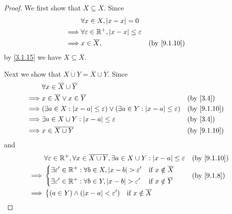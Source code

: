 \begin{proof}
  We first show that \(X \subseteq \overline{X}\).
  Since
  \begin{align*}
             & \forall x \in X, \abs{x - x} = 0                                            \\
    \implies & \forall \varepsilon \in \R^+, \abs{x - x} \leq \varepsilon                  \\
    \implies & x \in \overline{X},                                        &  & \by{9.1.10}
  \end{align*}
  by \cref{3.1.15} we have \(X \subseteq \overline{X}\).

  Next we show that \(\overline{X \cup Y} = \overline{X} \cup \overline{Y}\).
  Since
  \begin{align*}
             & \forall x \in \overline{X} \cup \overline{Y}                                                                            \\
    \implies & x \in \overline{X} \lor x \in \overline{Y}                                                             &  & \by{3.4}    \\
    \implies & (\exists a \in X : \abs{x - a} \leq \varepsilon) \lor (\exists a \in Y : \abs{x - a} \leq \varepsilon) &  & \by{9.1.10} \\
    \implies & \exists a \in X \cup Y : \abs{x - a} \leq \varepsilon                                                  &  & \by{3.4}    \\
    \implies & x \in \overline{X \cup Y}                                                                              &  & \by{9.1.10}
  \end{align*}
  and
  \begin{align*}
             & \forall \varepsilon \in \R^+, \forall x \in \overline{X \cup Y}, \exists a \in X \cup Y : \abs{x - a} \leq \varepsilon &  & \by{9.1.10} \\
    \implies & \begin{dcases}
                 \exists \varepsilon' \in \R^+ : \forall b \in X, \abs{x - b} > \varepsilon' & \text{if } x \notin \overline{X} \\
                 \exists \varepsilon' \in \R^+ : \forall b \in Y, \abs{x - b} > \varepsilon' & \text{if } x \notin \overline{Y}
               \end{dcases}      &  & \by{9.1.8}                          \\
    \implies & \begin{dcases}
                 (a \in Y) \land (\abs{x - a} < \varepsilon') & \text{if } x \notin \overline{X} \\

\end{dcases}
\end{align*}
\end{proof}
